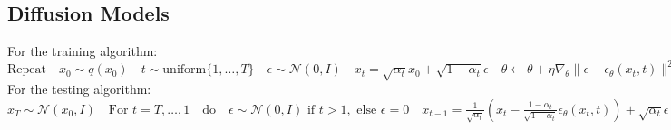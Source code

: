 \subsection*{Diffusion Models}
For the training algorithm:
$\text{Repeat} \quad x_0 \sim q(x_0) \quad t \sim \text{uniform}\{1, \ldots, T\} \quad \epsilon \sim \mathcal{N}(0, I) \quad x_t = \sqrt{\alpha_t} x_0 + \sqrt{1 - \alpha_t} \epsilon \quad \theta \leftarrow \theta + \eta \nabla_\theta \| \epsilon - \epsilon_\theta(x_t, t) \|^2 \quad \text{Until convergence}$
For the testing algorithm:
$x_T \sim \mathcal{N}(x_0, I) \quad \text{For } t = T, \ldots, 1 \quad \text{do} \quad \epsilon \sim \mathcal{N}(0, I) \text{ if } t > 1, \text{ else } \epsilon = 0 \quad x_{t-1} = \frac{1}{\sqrt{\alpha_t}} \left( x_t - \frac{1-\alpha_t}{\sqrt{1-\alpha_t}}\epsilon_\theta(x_t, t) \right) + \sqrt{\alpha_t}\epsilon \quad \text{Return } x_0$

